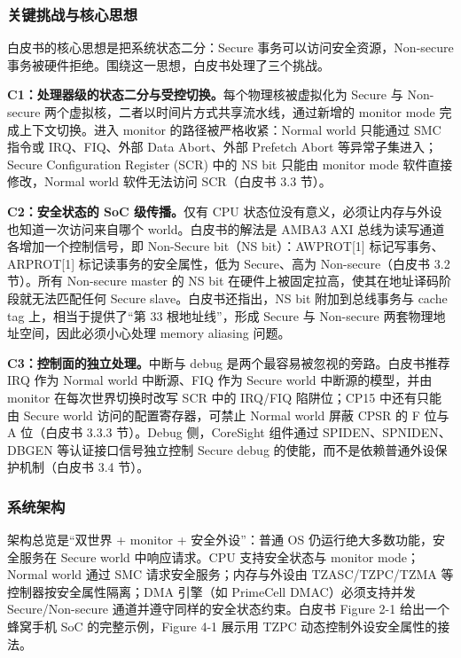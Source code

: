\documentclass[11pt]{ctexart}
\begin{document}
\subsubsection{关键挑战与核心思想}
白皮书的核心思想是把系统状态二分：Secure 事务可以访问安全资源，Non-secure 事务被硬件拒绝。围绕这一思想，白皮书处理了三个挑战。\par
\noindent\textbf{C1：处理器级的状态二分与受控切换。}每个物理核被虚拟化为 Secure 与 Non-secure 两个虚拟核，二者以时间片方式共享流水线，通过新增的 monitor mode 完成上下文切换。进入 monitor 的路径被严格收紧：Normal world 只能通过 SMC 指令或 IRQ、FIQ、外部 Data Abort、外部 Prefetch Abort 等异常子集进入；Secure Configuration Register (SCR) 中的 NS bit 只能由 monitor mode 软件直接修改，Normal world 软件无法访问 SCR（白皮书 3.3 节）。\par
\noindent\textbf{C2：安全状态的 SoC 级传播。}仅有 CPU 状态位没有意义，必须让内存与外设也知道一次访问来自哪个 world。白皮书的解法是 AMBA3 AXI 总线为读写通道各增加一个控制信号，即 Non-Secure bit（NS bit）：AWPROT[1] 标记写事务、ARPROT[1] 标记读事务的安全属性，低为 Secure、高为 Non-secure（白皮书 3.2 节）。所有 Non-secure master 的 NS bit 在硬件上被固定拉高，使其在地址译码阶段就无法匹配任何 Secure slave。白皮书还指出，NS bit 附加到总线事务与 cache tag 上，相当于提供了``第 33 根地址线''，形成 Secure 与 Non-secure 两套物理地址空间，因此必须小心处理 memory aliasing 问题。\par
\noindent\textbf{C3：控制面的独立处理。}中断与 debug 是两个最容易被忽视的旁路。白皮书推荐 IRQ 作为 Normal world 中断源、FIQ 作为 Secure world 中断源的模型，并由 monitor 在每次世界切换时改写 SCR 中的 IRQ/FIQ 陷阱位；CP15 中还有只能由 Secure world 访问的配置寄存器，可禁止 Normal world 屏蔽 CPSR 的 F 位与 A 位（白皮书 3.3.3 节）。Debug 侧，CoreSight 组件通过 SPIDEN、SPNIDEN、DBGEN 等认证接口信号独立控制 Secure debug 的使能，而不是依赖普通外设保护机制（白皮书 3.4 节）。\par
\subsubsection{系统架构}
架构总览是``双世界 + monitor + 安全外设''：普通 OS 仍运行绝大多数功能，安全服务在 Secure world 中响应请求。CPU 支持安全状态与 monitor mode；Normal world 通过 SMC 请求安全服务；内存与外设由 TZASC/TZPC/TZMA 等控制器按安全属性隔离；DMA 引擎（如 PrimeCell DMAC）必须支持并发 Secure/Non-secure 通道并遵守同样的安全状态约束。白皮书 Figure 2-1 给出一个蜂窝手机 SoC 的完整示例，Figure 4-1 展示用 TZPC 动态控制外设安全属性的接法。\par
\end{document}
